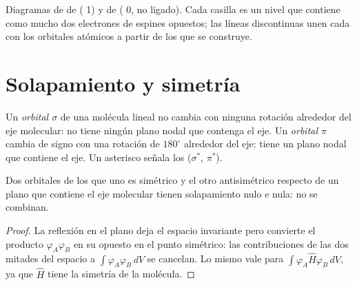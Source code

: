 \begin{omfigure}
\begin{MOdiagram}
\end{MOdiagram}
\hspace{1.5cm}
\begin{MOdiagram}
\end{MOdiagram}

{\small Diagramas de  de  ( 1) y de  ( 0, no ligado). Cada casilla es un nivel que contiene como mucho dos electrones de
espines opuestos; las líneas discontinuas unen cada  con los orbitales atómicos
a partir de los que se construye.}
\end{omfigure}

\section{Solapamiento y simetría}

\begin{definition}\label{def:b2:diatomic-mos:sigma-pi}
Un \emph{orbital $\sigma$} de una molécula lineal no cambia con ninguna
rotación alrededor del eje molecular: no tiene ningún plano nodal que contenga el eje. Un
\emph{orbital $\pi$} cambia de signo con una rotación de $180^\circ$ alrededor del
eje: tiene un plano nodal que contiene el eje. Un asterisco señala los  ($\sigma^*$, $\pi^*$).
\end{definition}

\begin{proposition}\label{prop:b2:diatomic-mos:symmetry}
Dos orbitales de los que uno es simétrico y el otro antisimétrico respecto
de un plano que contiene el eje molecular tienen solapamiento nulo e 
nula: no se combinan.
\end{proposition}

\begin{proof}
La reflexión en el plano deja el espacio invariante pero convierte el producto
$\varphi_A\varphi_B$ en su opuesto en el punto simétrico: las contribuciones de las
dos mitades del espacio a $\int\varphi_A\varphi_B\,dV$ se cancelan. Lo mismo vale para
$\int\varphi_A\hat H\varphi_B\,dV$, ya que $\hat H$ tiene la simetría de la molécula.
\end{proof}

